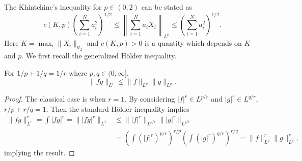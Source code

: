 \begin{answer}
	The Khintchine's inequality for \(p \in (0, 2)\) can be stated as
	\[
		c(K, p) \left( \sum_{i=1}^{N} a_i^2 \right) ^{1 / 2}
		\leq \left\lVert \sum_{i=1}^{N} a_i X_i \right\rVert _{L^p}
		\leq \left( \sum_{i=1}^{N} a_i^2 \right) ^{1 / 2}.
	\]
	Here \(K = \max _i \lVert X_i \rVert _{\psi _2}\) and \(c(K, p) > 0\) is a quantity which depends on \(K\) and \(p\). We first recall the generalized Hölder inequality.
	\begin{theorem}\label{thm:generalized-Holder-inequality}
		For \(1 / p + 1 / q = 1 / r\) where \(p, q\in (0, \infty ]\),
		\[
			\lVert f g \rVert _{L^r}
			\leq \lVert f \rVert _{L^p} \lVert g \rVert _{L^q}.
		\]
	\end{theorem}
	\begin{proof}
		The classical case is when \(r = 1\). By considering \(\vert f \vert ^r \in L^{p / r}\) and \(\vert g \vert ^r \in L^{q / r}\), \(r / p + r / q = 1\). Then the standard Hölder inequality implies
		\[
			\begin{split}
				\lVert fg \rVert _{L^r}^r
				= \int \vert fg \vert ^r
				= \lVert \vert fg \vert ^r \rVert _{L^1}
				 & \leq \lVert \vert f \vert ^r \rVert _{L^{p / r}} \lVert \vert g \vert ^r \rVert _{L^{q / r}}                                                  \\
				 & = \left( \int \left( \vert f \vert ^r \right) ^{p / r} \right) ^{r / p} \left( \int \left( \vert g \vert ^r \right) ^{q / r} \right) ^{r / q}
				= \lVert f \rVert _{L^p}^r \lVert g \rVert _{L^q}^r,
			\end{split}
		\]
		implying the result.
	\end{proof}


\end{answer}
